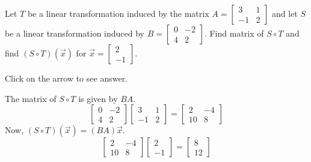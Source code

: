 \documentclass{ximera}
\begin{document}
\begin{problem}\label{prb:6.5} Let $T$ be a linear transformation induced by the matrix $A = \left[ \begin{array}{rr}
3 & 1 \\
-1 & 2
\end{array}\right]$ and let $S$ be a linear transformation induced by $B = \left[ \begin{array}{rr}
0 & -2 \\
4 & 2
\end{array}\right]$. Find matrix of $S \circ T$ and find $\left( S \circ T \right) \left( \vec{x} \right)$ for $\vec{x} = \left[ \begin{array}{r}
2 \\
-1
\end{array} \right]$.

Click on the arrow to see answer.
\begin{expandable}
The matrix of $S \circ T$ is given by $BA$.
\[
\left[ \begin{array}{rr}
0 & -2 \\
4 & 2
\end{array}\right] \left[ \begin{array}{rr}
3 & 1 \\
-1 & 2
\end{array}\right] = \left[
\begin{array}{rr}
2 & -4 \\
10 & 8
\end{array}
\right]
\]
Now, $\left( S \circ T \right) \left( \vec{x} \right) = (BA) \vec{x}$.
\[
 \left[
\begin{array}{rr}
2 & -4 \\
10 & 8
\end{array}
\right]
\left[ \begin{array}{r}
2 \\
-1
\end{array} \right]
=
\left[
\begin{array}{r}
8 \\
12
\end{array}
\right]
\]

\end{expandable}
\end{problem}
\end{document}
